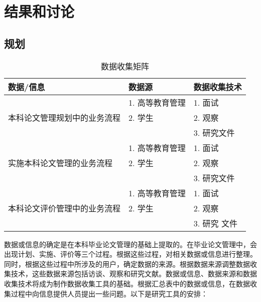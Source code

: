 
\chapter{结果和讨论}
\label{结果和讨论}


\section{规划}
\begin{table}[htbp]
      \centering
      \song\wuhao
      \caption{数据收集矩阵}
      \label{数据收集矩阵}
      \begin{tabular}{lll}
            \hline
            数据/信息                                     & 数据源                 & 数据收集技术        \\ \hline
            \multirow{3}{*}{本科论文管理规划中的业务流程} & 1.        高等教育管理 & 1.        面试      \\
                                                          & 2.        学生         & 2.        观察      \\
                                                          &                        & 3.        研究文件  \\ \hline
            \multirow{3}{*}{实施本科论文管理的业务流程}   & 1.       高等教育管理  & 1.        面试      \\
                                                          & 2.        学生         & 2.        观察      \\
                                                          &                        & 3.        研究文件  \\ \hline
            \multirow{3}{*}{本科论文评价管理中的业务流程} & 1.        高等教育管理 & 1.        面试      \\
                                                          & 2.        学生         & 2.        观察      \\
                                                          &                        & 3.        研究 文件 \\ \hline
      \end{tabular}
\end{table}

数据或信息的确定是在本科毕业论文管理的基础上提取的。在毕业论文管理中，会出现计划、实施、评价等三个过程。根据这些过程，对相关数据或信息进行整理。同时，根据这些过程中所涉及的用户，确定数据的来源。根据数据来源调整数据收集技术，这些数据来源包括访谈、观察和研究文献。数据或信息、数据来源和数据收集技术将成为制作数据收集工具的基础。根据汇总表中的数据或信息，在数据收集过程中向信息提供人员提出一些问题。以下是研究工具的安排：

